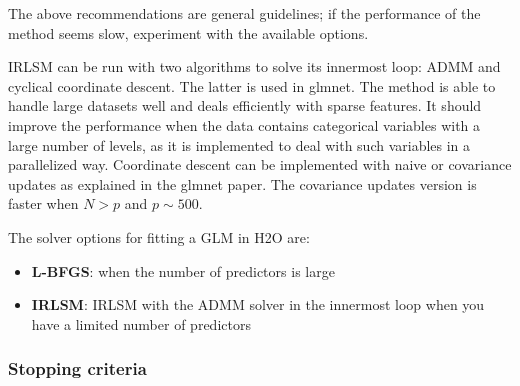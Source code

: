 The above recommendations are general guidelines; if the performance of the method seems slow, experiment with the available options. 

\vspace{0.2cm}
IRLSM can be run with two algorithms to solve its innermost loop: ADMM and cyclical coordinate descent. The latter is used in glmnet. The method is able to handle large datasets well and deals efficiently with sparse features. It should improve the performance when the data contains categorical variables with a large number of levels, as it is implemented to deal with such variables in a parallelized way. Coordinate descent can be implemented with naive or covariance updates as explained in the glmnet paper. The covariance updates version is faster when $N>p$ and $p \sim 500$. 

The solver options for fitting a GLM in H2O are:
\begin{itemize}
 \item \textbf{L-BFGS}: when the number of predictors is large
 \item \textbf{IRLSM}: IRLSM with the ADMM solver in the innermost loop when you have a limited number of predictors
\end{itemize}


\subsubsection{Stopping criteria}

